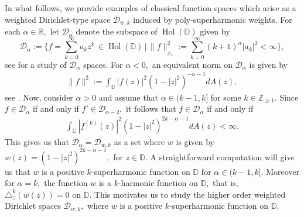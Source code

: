 \documentclass[10pt,oneside,reqno]{amsart}
\theoremstyle{definition}
\theoremstyle{remark}
\newcommand{\D}{\mathbb D}
\numberwithin{equation}{section}
\begin{document}
In what follows, we provide examples of classical function spaces which arise as a weighted Dirichlet-type space $\mathscr D_{w,k}$ induced by poly-superharmonic weights. For each $\alpha \in \mathbb R,$ let $\mathscr D_{\alpha}$ denote the subspace of $\operatorname{Hol}(\D)$ given by
\begin{equation}
\mathscr D_{\alpha}:= \bigg\{f=\sum_{k=0}^\infty a_k z^k \,\in \operatorname{Hol}(\D)  \, \Big| \,  \|f\|^2_{_{\mathscr D_{\alpha}}} := \sum_{k=0}^\infty(k+1)^{\alpha} |a_k|^2 < \infty \bigg\},
\label{eq:D-alpha}
\end{equation}
see \cite{Taylor66} for a study of $\mathscr D_{\alpha}$ spaces. For $\alpha <0,$ an equivalent norm on  $\mathscr D_{\alpha}$ is given by 
\begin{align*}
    \|f\|^2:= \int_{\mathbb D} |f(z)|^2 (1-|z|^2)^{-\alpha-1}dA(z), 
\end{align*}
see \cite[Lemma 2]{Taylor66}. Now, consider $\alpha >0$ and assume that $\alpha\in (k-1,k]$ for some $k\in \mathbb Z_{\geqslant 1}.$ Since $f\in \mathscr D_{\alpha}$ if and only if $f'\in \mathscr D_{\alpha -2},$ it follows that $f\in \mathscr D_{\alpha}$ if and only if 
\begin{align*}
    \int_\mathbb D |f^{(k)}(z)|^2 (1-|z|^2)^{2k-\alpha-1} dA(z) < \infty.
\end{align*} This gives us that $\mathscr D_{\alpha}= \mathscr D_{w,k}$ as a set where $w$ is given by $w(z)= (1-|z|^2)^{2k-\alpha-1},$ for $z\in\D.$ A straightforward computation will give us that $w$ is a positive $k$-superharmonic function on $\D$ for $\alpha\in (k-1,k].$ Moreover for $\alpha=k,$ the function $w$ is a $k$-harmonic function on $\D,$ that is, $\triangle_z^{k}(w(z))=0$ on $\D.$ This motivates us to study the higher order weighted Dirichlet spaces $\mathscr D_{w,k},$ where $w$ is a positive $k$-superharmonic function on $\D.$ 

  
\end{document}
